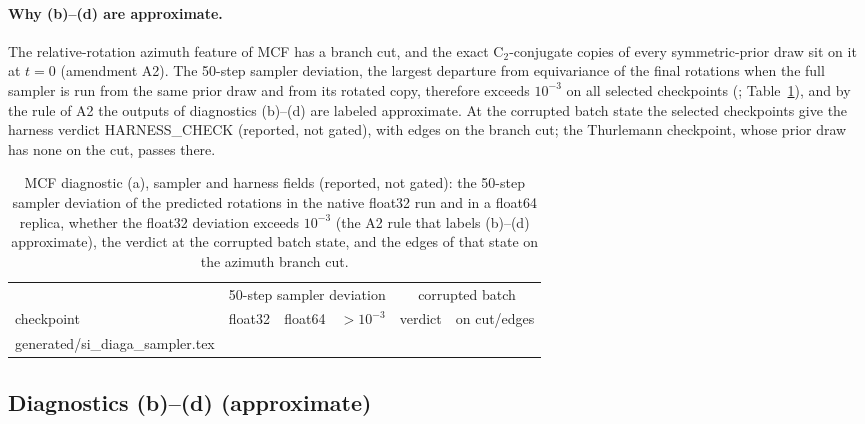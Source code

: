 \documentclass[journal=acsodf,manuscript=article]{achemso}
\makeatletter
\newcommand{\inputrows}[1]{\@@input #1 }
\makeatother
\begin{document}
\paragraph{Why (b)--(d) are approximate.} The relative-rotation azimuth feature of MCF has a
branch cut, and the exact C$_2$-conjugate copies of every symmetric-prior draw sit on it at
$t=0$ (amendment A2). The 50-step sampler deviation, the largest departure from equivariance of
the final rotations when the full sampler is run from the same prior draw and from its rotated
copy, therefore exceeds $10^{-3}$ on all
\svDiagAApproxN{} selected checkpoints (\svDiagAApprox; Table~\ref{tab:si_diaga2}), and by the
rule of A2 the outputs of diagnostics (b)--(d) are labeled approximate. At the corrupted batch
state the selected checkpoints give the harness verdict HARNESS\_CHECK (reported, not gated),
with edges on the branch cut; the Thurlemann checkpoint, whose prior draw has none on the cut,
passes there.

\begin{table}[htbp]
\caption{MCF diagnostic (a), sampler and harness fields (reported, not gated): the 50-step
sampler deviation of the predicted rotations in the native float32 run and in a float64
replica, whether the float32 deviation exceeds $10^{-3}$ (the A2 rule that labels (b)--(d)
approximate), the verdict at the corrupted batch state, and the edges of that state on the
azimuth branch cut.}
\label{tab:si_diaga2}
\centering
\small
\begin{tabular}{@{}lccccc@{}}
\toprule
 & \multicolumn{3}{c}{50-step sampler deviation} & \multicolumn{2}{c}{corrupted batch} \\
\cmidrule(lr){2-4}\cmidrule(lr){5-6}
checkpoint & float32 & float64 & $>10^{-3}$ & verdict & on cut/edges \\
\midrule
\inputrows{generated/si_diaga_sampler.tex}
\bottomrule
\end{tabular}
\end{table}

\subsection{Diagnostics (b)--(d) (approximate)}
\end{document}
